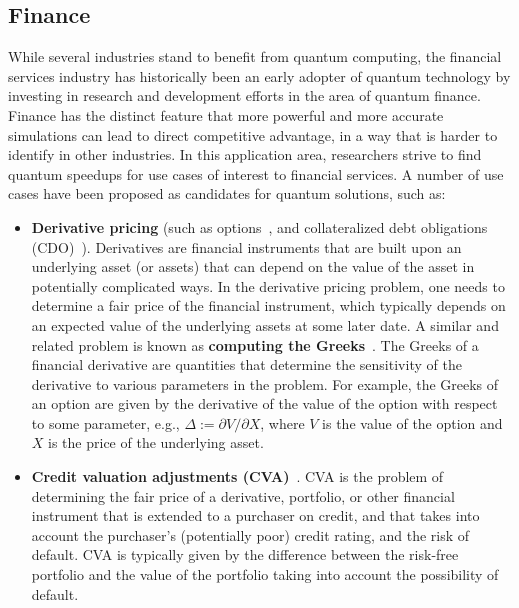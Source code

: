 
\begin{refsection}

\section{Finance }\label{appl:finance}

While several industries stand to benefit from quantum computing, the financial services industry has historically been an early adopter of quantum technology by investing in research and development efforts in the area of quantum finance. Finance has the distinct feature that more powerful and more accurate simulations can lead to direct competitive advantage, in a way that is harder to identify in other industries. In this application area, researchers strive to find quantum speedups for use cases of interest to financial services. A number of use cases have been proposed as candidates for quantum solutions, such as:
\begin{itemize}
    \item \textbf{Derivative pricing} (such as options~\cite{stamatopoulos2020option}, and collateralized debt obligations (CDO)~\cite{tang2021quantum}). Derivatives are financial instruments that are built upon an underlying asset (or assets) that can depend on the value of the asset in potentially complicated ways. In the derivative pricing problem, one needs to determine a fair price of the financial instrument, which typically depends on an expected value of the underlying assets at some later date. A similar and related problem is known as \textbf{computing the Greeks}~\cite{stamatopoulos2022towards}. The Greeks of a financial derivative are quantities that determine the sensitivity of the derivative to various parameters in the problem. For example, the Greeks of an option are given by the derivative of the value of the option with respect to some parameter, e.g., $\Delta:=\partial V/\partial X$, where $V$ is the value of the option and $X$ is the price of the underlying asset. 
    \item \textbf{Credit valuation adjustments (CVA)}~\cite{han2022quantum}. CVA is the problem of determining the fair price of a derivative, portfolio, or other financial instrument that is extended to a purchaser on credit, and that takes into account the purchaser's (potentially poor) credit rating, and the risk of default. CVA is typically given by the difference between the risk-free portfolio and the value of the portfolio taking into account the possibility of default.

\end{itemize}
\end{refsection}
